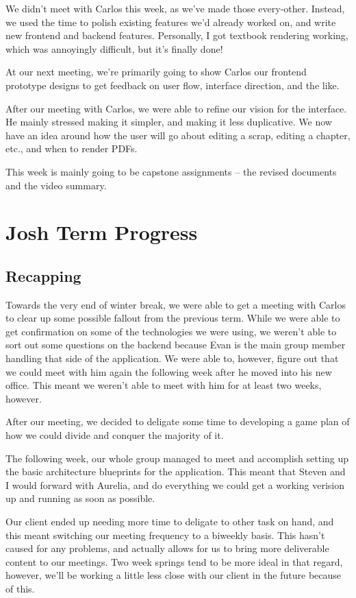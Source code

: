 \documentclass[onecolumn, draftclsnofoot,10pt, compsoc]{IEEEtran}
\begin{document}
We didn't meet with Carlos this week, as we've made those every-other. 
Instead, we used the time to polish existing features we'd already worked on, 
and write new frontend and backend features. Personally, I got textbook 
rendering working, which was annoyingly difficult, but it's finally done!

At our next meeting, we're primarily going to show Carlos our frontend 
prototype designs to get feedback on user flow, interface direction, 
and the like.

After our meeting with Carlos, we were able to refine our vision for the 
interface. He mainly stressed making it simpler, and making it less duplicative. 
We now have an idea around how the user will go about editing a scrap, editing 
a chapter, etc., and when to render PDFs.

This week is mainly going to be capstone assignments -- the revised documents 
and the video summary.


\section{Josh Term Progress}
\subsection{Recapping}
Towards the very end of winter break, we were able to get a meeting with Carlos to clear
up some possible fallout from the previous term. While we were able to get
confirmation on some of the technologies we were using, we weren't able to sort out some
questions on the backend because Evan is the main group member handling that side of the
application. We were able to, however, figure out that we could meet with
him again the following week after he moved into his new office. This meant we weren't
able to meet with him for at least two weeks, however.

After our meeting, we decided to deligate some time to developing a game plan of how we
could divide and conquer the majority of it.

The following week, our whole group managed to meet and accomplish setting up the basic
architecture blueprints for the application. This meant that Steven and I would forward
with Aurelia, and do everything we could get a working verision up and running as soon
as possible.

Our client ended up needing more time to deligate to other task on hand, and this meant
switching our meeting frequency to a biweekly basis. This hasn't caused for any problems,
and actually allows for us to bring more deliverable content to our meetings. Two week
springs tend to be more ideal in that regard, however, we'll be working a little less
close with our client in the future because of this.
\end{document}
